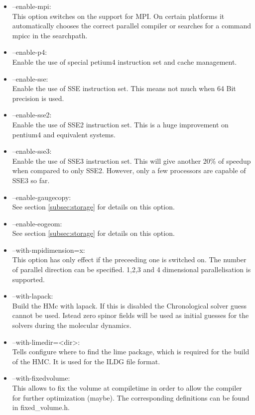 \begin{itemize}
\item {\ttfamily --enable-mpi}:\\
  This option switches on the support for MPI. On certain platforms it
  automatically chooses the correct parallel compiler or searches for
  a command {\ttfamily mpicc} in the searchpath.

\item {\ttfamily --enable-p4}:\\
  Enable the use of special petium4 instruction set and cache
  management.

\item {\ttfamily --enable-sse}:\\
  Enable the use of SSE instruction set. This means not much when 64
  Bit precision is used.

\item {\ttfamily --enable-sse2}:\\
  Enable the use of SSE2 instruction set. This is a huge improvement
  on pentium4 and equivalent systems.

\item {\ttfamily --enable-sse3}:\\
  Enable the use of SSE3 instruction set. This will give another 20\%
  of speedup when compared to only SSE2. However, only a few
  processors are capable of SSE3 so far.

\item {\ttfamily --enable-gaugecopy}:\\
  See section \ref{subsec:storage} for details on this option.

\item {\ttfamily --enable-eogeom}:\\
  See section \ref{subsec:storage} for details on this option.


\item {\ttfamily --with-mpidimension=x}:\\
  This option has only effect if the preceeding one is switched
  on. The number of parallel direction can be specified. 1,2,3 and 4
  dimensional parallelisation is supported.

\item {\ttfamily --with-lapack}:\\
  Build the HMc with lapack. If this is disabled the Chronological
  solver guess cannot be used. Istead zero spinor fields will be used
  as initial guesses for the solvers during the molecular dynamics.

\item {\ttfamily --with-limedir=<dir>}:\\
 Tells configure where to find the lime package, which is required for
 the build of the HMC. It is used for the ILDG file format.

\item {\ttfamily --with-fixedvolume}:\\
  This allows to fix the volume at compiletime in order to allow the
  compiler for further optimization (maybe). The corresponding
  definitions can be found in {\ttfamily fixed\_volume.h}.

\end{itemize}

